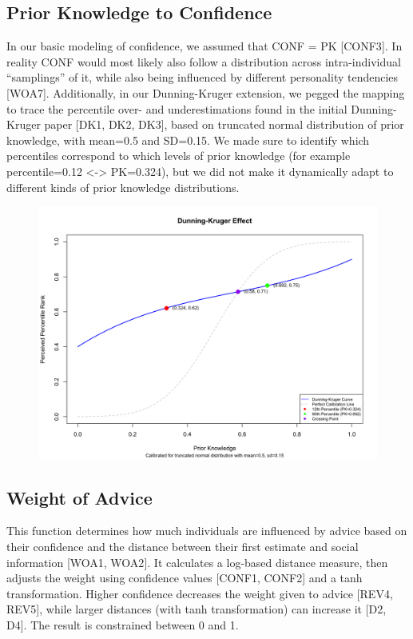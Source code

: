 \documentclass[
  man,floatsintext]{apa6}
\begin{document}
\hypertarget{prior-knowledge-to-confidence}{%
\subsection{Prior Knowledge to Confidence}\label{prior-knowledge-to-confidence}}

In our basic modeling of confidence, we assumed that CONF = PK {[}CONF3{]}. In reality CONF would most likely also follow a distribution across intra-individual ``samplings'' of it, while also being influenced by different personality tendencies {[}WOA7{]}. Additionally, in our Dunning-Kruger extension, we pegged the mapping to trace the percentile over- and underestimations found in the initial Dunning-Kruger paper {[}DK1, DK2, DK3{]}, based on truncated normal distribution of prior knowledge, with mean=0.5 and SD=0.15. We made sure to identify which percentiles correspond to which levels of prior knowledge (for example percentile=0.12 \textless-\textgreater{} PK=0.324), but we did not make it dynamically adapt to different kinds of prior knowledge distributions.

\begin{figure}[H]
\includegraphics[width=5.59in]{photos/dk} \caption{ }\label{fig:unnamed-chunk-2}
\end{figure}

\hypertarget{weight-of-advice}{%
\subsection{Weight of Advice}\label{weight-of-advice}}

This function determines how much individuals are influenced by advice based on their confidence and the distance between their first estimate and social information {[}WOA1, WOA2{]}. It calculates a log-based distance measure, then adjusts the weight using confidence values {[}CONF1, CONF2{]} and a tanh transformation. Higher confidence decreases the weight given to advice {[}REV4, REV5{]}, while larger distances (with tanh transformation) can increase it {[}D2, D4{]}. The result is constrained between 0 and 1.
\end{document}
